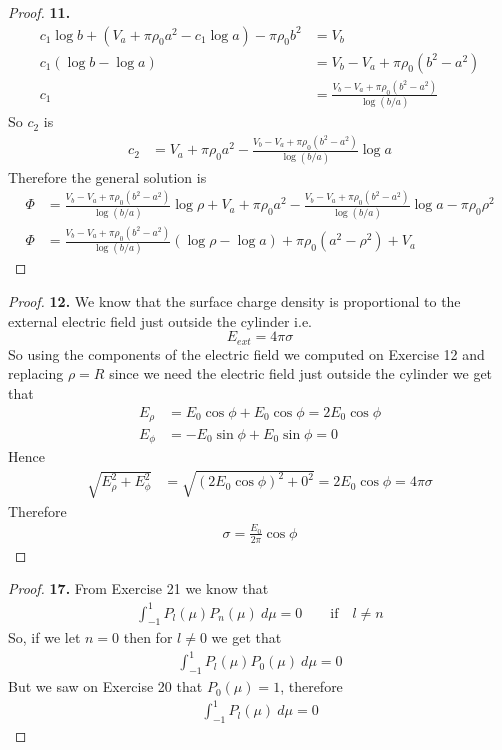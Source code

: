 \documentclass[11pt]{article}
\theoremstyle{definition}
\begin{document}
\begin{proof}{\textbf{11.}}
\begin{align*}
    c_1 \log b + (V_a + \pi\rho_0 a^2 - c_1 \log a) - \pi\rho_0 b^2 &= V_b\\
    c_1(\log b - \log a) &= V_b - V_a + \pi\rho_0(b^2 - a^2)\\
    c_1 &= \frac{V_b - V_a + \pi\rho_0(b^2 - a^2)}{\log(b/a)}
\end{align*}
So $c_2$ is 
\begin{align*}
    c_2 &= V_a + \pi\rho_0a^2
    - \frac{V_b - V_a + \pi\rho_0(b^2 - a^2)}{\log(b/a)}\log a
\end{align*}
Therefore the general solution is
\begin{align*}
    \Phi &= \frac{V_b - V_a + \pi\rho_0(b^2 - a^2)}{\log(b/a)} \log\rho
    + V_a + \pi\rho_0a^2
    - \frac{V_b - V_a + \pi\rho_0(b^2 - a^2)}{\log(b/a)}\log a 
    - \pi\rho_0\rho^2\\
    \Phi &= \frac{V_b - V_a + \pi\rho_0(b^2 - a^2)}{\log(b/a)}
    (\log\rho - \log a)
    + \pi\rho_0(a^2 - \rho^2) + V_a
\end{align*}
\end{proof}

\cleardoublepage
\begin{proof}{\textbf{12.}}
We know that the surface charge density is proportional to the external 
electric field just outside the cylinder i.e.
$$E_{ext} = 4\pi \sigma$$
So using the components of the electric field we computed on Exercise 12
and replacing $\rho = R$ since we need the electric field just outside the
cylinder we get that 
\begin{align*}
    E_\rho &= E_0\cos\phi + E_0\cos\phi = 2E_0\cos\phi\\
    E_\phi &= -E_0\sin\phi + E_0\sin\phi = 0
\end{align*}
Hence
\begin{align*}
    \sqrt{E_\rho^2 + E_\phi^2} &= \sqrt{(2E_0\cos\phi)^2 + 0^2}
    = 2E_0\cos\phi = 4\pi\sigma
\end{align*}
Therefore
\begin{align*}
    \sigma = \frac{E_0}{2\pi}\cos\phi
\end{align*}
\end{proof}

\cleardoublepage
\begin{proof}{\textbf{17.}}
From Exercise 21 we know that
\begin{align*}
    \int_{-1}^1 P_l(\mu)P_n(\mu)~d\mu = 0 \qquad \text{if}\quad l \neq n
\end{align*}
So, if we let $n = 0$ then for $l \neq 0$ we get that
\begin{align*}
    \int_{-1}^1 P_l(\mu)P_0(\mu)~d\mu = 0
\end{align*}
But we saw on Exercise 20 that $P_0(\mu) = 1$, therefore
\begin{align*}
    \int_{-1}^1 P_l(\mu)~d\mu = 0
\end{align*}
\end{proof}
\end{document}
